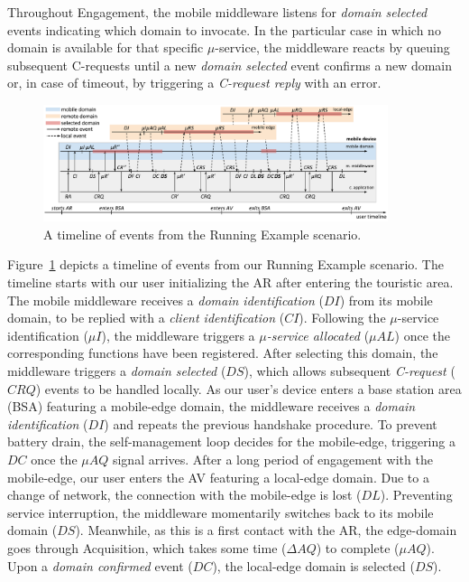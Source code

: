 Throughout Engagement, the mobile middleware listens for \textit{domain selected} events indicating which domain to invocate. In the particular case in which no domain is available for that specific $\mu$-service,
the middleware reacts by queuing subsequent C-requests until a new \textit{domain selected} event confirms a new domain or, in case of timeout, by triggering a \textit{C-request reply} with an error. 


\begin{figure}[tbp]
	\includegraphics[width=0.9\textwidth]{figs/A3-E-instance-events}
	\caption{A timeline of events from the Running Example scenario.}
	\label{fig:A3-E-instance-events}
\end{figure}

Figure~\ref{fig:A3-E-instance-events} depicts a timeline of events from our Running Example scenario. The timeline starts with our user initializing the AR after entering the touristic area. The mobile middleware receives a \textit{domain identification} ($DI$) from its mobile domain, to be replied with a \textit{client identification} ($CI$). Following the $\mu$-service identification ($\mu I$), the middleware triggers a \textit{$\mu$-service allocated} ($\mu AL$) once the corresponding functions have been registered. After selecting this domain, the middleware triggers a \textit{domain selected} ($DS$), which allows subsequent \textit{C-request} ($CRQ$) events to be handled locally. As our user's device enters a base station area (BSA) featuring a mobile-edge domain, the middleware receives a \textit{domain identification} ($DI$) and repeats the previous handshake procedure. To prevent battery drain, the self-management loop decides for the mobile-edge, triggering a $DC$ once the $\mu AQ$ signal arrives. After a long period of engagement with the mobile-edge, our user enters the AV featuring a local-edge domain. Due to a change of network, the connection with the mobile-edge is lost ($DL$). Preventing service interruption, the middleware momentarily switches back to its mobile domain ($DS$). Meanwhile, as this is a first contact with the AR, the edge-domain goes through Acquisition, which takes some time ($\Delta AQ$) to complete ($\mu AQ$). Upon a \textit{domain confirmed} event ($DC$), the local-edge domain is selected ($DS$). 

